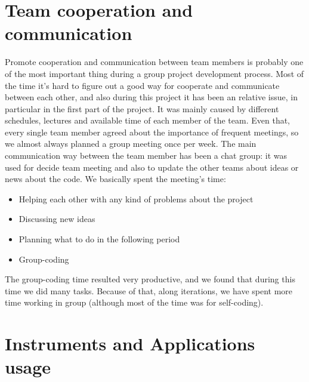 \section{Team cooperation and communication}
Promote cooperation and communication between team members is probably one of the most important thing during a group project development process. Most of the time it's hard to figure out a good way for cooperate and communicate between each other, and also during this project it has been an relative issue, in particular in the first part of the project. It was mainly caused by different schedules, lectures and available time of each member of the team.
Even that, every single team member agreed about the importance of frequent meetings, so we almost always planned a group meeting once per week. 
The main communication way between the team member has been a chat group: it was used for decide team meeting and also to update the other teams about ideas or news about the code.
We basically spent the meeting's time:
\vspace{-5mm}
\begin{itemize}
 \setlength{\itemsep}{-5pt}
 \item Helping each other with any kind of problems about the project
 \item Discussing new ideas 
 \item Planning what to do in the following period
 \item Group-coding 
\end{itemize} 
\vspace{-5mm}
The group-coding time resulted very productive, and we found that during this time we did many tasks. Because of that, along iterations, we have spent more time working in group (although most of the time was for self-coding).
\section{Instruments and Applications usage}

